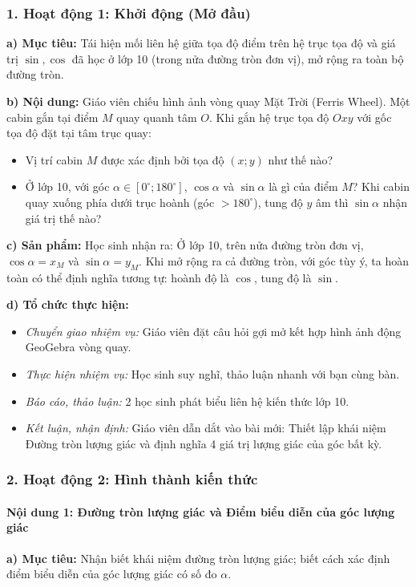 \documentclass[12pt, a4paper]{article}
\begin{document}
\subsubsection*{1. Hoạt động 1: Khởi động (Mở đầu)}
\textbf{a) Mục tiêu:} Tái hiện mối liên hệ giữa tọa độ điểm trên hệ trục tọa độ và giá trị $\sin, \cos$ đã học ở lớp 10 (trong nửa đường tròn đơn vị), mở rộng ra toàn bộ đường tròn.

\textbf{b) Nội dung:} Giáo viên chiếu hình ảnh vòng quay Mặt Trời (Ferris Wheel). Một cabin gắn tại điểm $M$ quay quanh tâm $O$. Khi gắn hệ trục tọa độ $Oxy$ với gốc tọa độ đặt tại tâm trục quay:
\begin{itemize}[leftmargin=0.6cm]
    \item Vị trí cabin $M$ được xác định bởi tọa độ $(x; y)$ như thế nào?
    \item Ở lớp 10, với góc $\alpha \in [0^\circ; 180^\circ]$, $\cos\alpha$ và $\sin\alpha$ là gì của điểm $M$? Khi cabin quay xuống phía dưới trục hoành (góc $> 180^\circ$), tung độ $y$ âm thì $\sin\alpha$ nhận giá trị thế nào?
\end{itemize}

\textbf{c) Sản phẩm:} Học sinh nhận ra: Ở lớp 10, trên nửa đường tròn đơn vị, $\cos\alpha = x_M$ và $\sin\alpha = y_M$. Khi mở rộng ra cả đường tròn, với góc tùy ý, ta hoàn toàn có thể định nghĩa tương tự: hoành độ là $\cos$, tung độ là $\sin$.

\textbf{d) Tổ chức thực hiện:}
\begin{itemize}[leftmargin=0.6cm]
    \item \textit{Chuyển giao nhiệm vụ:} Giáo viên đặt câu hỏi gợi mở kết hợp hình ảnh động GeoGebra vòng quay.
    \item \textit{Thực hiện nhiệm vụ:} Học sinh suy nghĩ, thảo luận nhanh với bạn cùng bàn.
    \item \textit{Báo cáo, thảo luận:} 2 học sinh phát biểu liên hệ kiến thức lớp 10.
    \item \textit{Kết luận, nhận định:} Giáo viên dẫn dắt vào bài mới: Thiết lập khái niệm Đường tròn lượng giác và định nghĩa 4 giá trị lượng giác của góc bất kỳ.
\end{itemize}

\subsubsection*{2. Hoạt động 2: Hình thành kiến thức}

\paragraph{Nội dung 1: Đường tròn lượng giác và Điểm biểu diễn của góc lượng giác}
\textbf{a) Mục tiêu:} Nhận biết khái niệm đường tròn lượng giác; biết cách xác định điểm biểu diễn của góc lượng giác có số đo $\alpha$.
\end{document}
